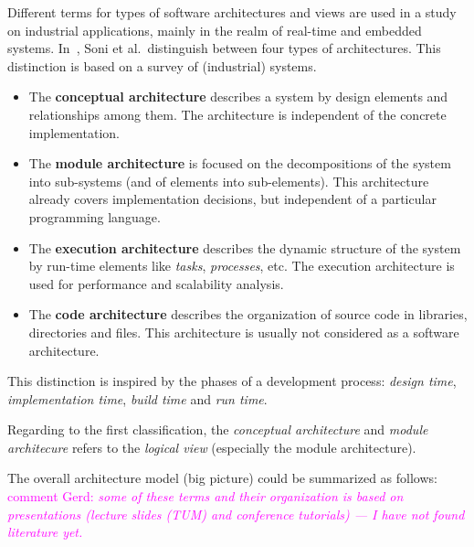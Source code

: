 \documentclass{llncs} %
\newcommand{\ggr}[1]{\textcolor{magenta}{comment Gerd: \textit{#1}}}
\begin{document}
Different terms for types of software architectures and views are used in a study 
on industrial applications, mainly in the realm of real-time and embedded systems.
In~\cite{DBLP:conf/icse/SoniNH95}, Soni et al.~distinguish between four types of architectures.
This distinction is based on a survey of (industrial) systems.
 \begin{itemize}
	 \item The \textbf{conceptual architecture} describes a system by design elements
	and relationships among them. The architecture is independent of the concrete implementation.
		\item The \textbf{module architecture} is focused on the decompositions of the
		  system into sub-systems (and of elements into sub-elements). 
			 This architecture already covers implementation decisions,
			 but independent of a particular programming language.
			 
	  \item The \textbf{execution architecture} describes the dynamic structure of the system
		        by run-time elements like \emph{tasks}, \emph{processes}, etc.
						The execution architecture is used for performance and scalability analysis.
		 \item The \textbf{code architecture} describes the organization of source code in
		       libraries, directories and files.
					This architecture is usually not considered as a software architecture.
 \end{itemize}

This distinction is inspired by the phases of a development process:
\emph{design time}, \emph{implementation time}, \emph{build time} and \emph{run time}.

Regarding to the first classification, the \emph{conceptual architecture} and \emph{module architecure}
refers to the \emph{logical view} (especially the module architecture).



The overall architecture model (big picture) could be summarized as follows:
\ggr{some of these terms and their organization is based on
      presentations (lecture slides (TUM) and conference tutorials)  --- I have not found 
			 literature yet.}
			
\end{document}
